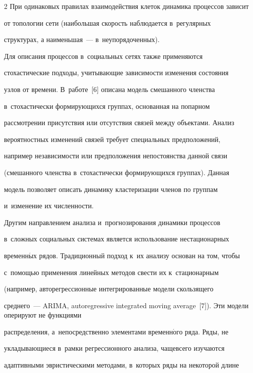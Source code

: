 \begin{multicols}{2}
При одинаковых правилах взаимодействия клеток динамика процессов зависит 


от топологии сети (наибольшая скорость наблюдается в~регулярных 


структурах, а наименьшая~--- в~неупорядоченных).


  


  Для описания процессов в~социальных сетях также применяются 


стохастические подходы, учитывающие зависимости изменения состояния 


узлов от времени. В~работе~[6] описана модель смешанного членства 


в~стохастически формирующихся группах, основанная на попарном 


рассмотрении присутствия или отсутствия связей между объектами. Анализ 


вероятностных изменений связей требует специальных предположений, 


например независимости или предположения непостоянства данной связи 


(смешанного членства в~стохастически формирующихся группах). Данная 


модель позволяет описать динамику кластеризации членов по группам 


и~изменение их численности.


  


  Другим направлением анализа и~прогнозирования динамики процессов 


в~сложных социальных системах является использование нестационарных 


временн$\acute{\mbox{ы}}$х рядов. Традиционный подход к~их анализу основан на том, чтобы 


с~помощью применения линейных методов свести их к~стационарным 


(например, авторегрессионные интегрированные модели скользящего 


среднего~--- ARIMA, autoregressive integrated moving average~[7]). Эти модели оперируют не функциями 


распределения, а~непосредственно элементами временн$\acute{\mbox{о}}$го ряда. Ряды, не 


укла\-ды\-ва\-ющи\-еся в~рамки регрессионного анализа, чаще\linebreak всего изучаются 


адаптивными эвристическими методами, в~которых ряды на некоторой длине 



\end{multicols}
